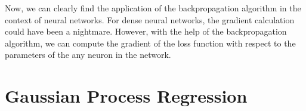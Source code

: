 Now, we can clearly find the application of the backpropagation algorithm in the context of neural networks. For dense neural networks, the gradient calculation could have been a nightmare. However, with the help of the backpropagation algorithm, we can compute the gradient of the loss function with respect to the parameters of the any neuron in the network.


\section{Gaussian Process Regression}






    














